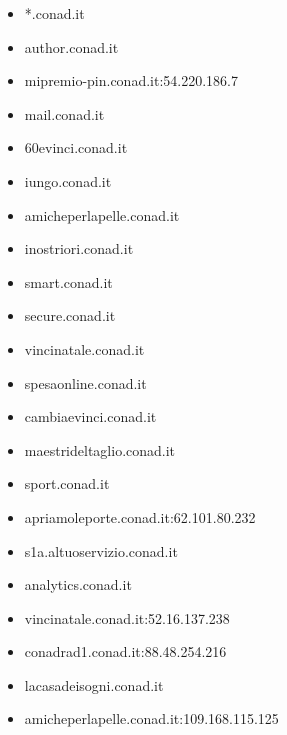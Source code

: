 \documentclass{article}
\begin{document}
\begin{itemize}
        \item *.conad.it
    
        \item author.conad.it
    
        \item mipremio-pin.conad.it:54.220.186.7
    
        \item mail.conad.it
    
        \item 60evinci.conad.it
    
        \item iungo.conad.it
    
        \item amicheperlapelle.conad.it
    
        \item inostriori.conad.it
    
        \item smart.conad.it
    
        \item secure.conad.it
    
        \item vincinatale.conad.it
    
        \item spesaonline.conad.it
    
        \item cambiaevinci.conad.it
    
        \item maestrideltaglio.conad.it
    
        \item sport.conad.it
    
        \item apriamoleporte.conad.it:62.101.80.232
    
        \item s1a.altuoservizio.conad.it
    
        \item analytics.conad.it
    
        \item vincinatale.conad.it:52.16.137.238
    
        \item conadrad1.conad.it:88.48.254.216
    
        \item lacasadeisogni.conad.it
    
        \item amicheperlapelle.conad.it:109.168.115.125
    

\end{itemize}
\end{document}

